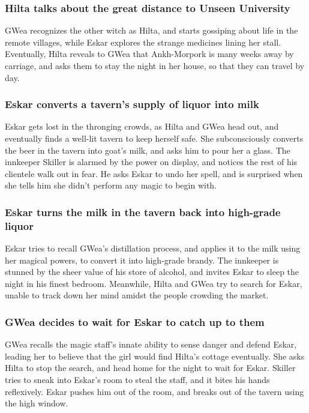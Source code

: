 \subsubsection{\Gls{Hilta} talks about the great distance to Unseen University}
\Gls{GWea} recognizes the other witch as \Gls{Hilta}, and starts gossiping about life in the remote
villages, while \Gls{Eskar} explores the strange medicines lining her stall. Eventually, \Gls{Hilta}
reveals to \Gls{GWea} that Ankh-Morpork is many weeks away by carriage, and asks them to stay the
night in her house, so that they can travel by day.

\subsubsection{\Gls{Eskar} converts a tavern's supply of liquor into milk}
\Gls{Eskar} gets lost in the thronging crowds, as \Gls{Hilta} and \Gls{GWea} head out, and
eventually finds a well-lit tavern to keep herself safe. She subconsciously converts the beer in
the tavern into goat's milk, and asks him to pour her a glass. The innkeeper \Gls{Skiller} is
alarmed by the power on display, and notices the rest of his clientele walk out in fear. He asks
\Gls{Eskar} to undo her spell, and is surprised when she tells him she didn't perform any magic to
begin with.

\subsubsection{\Gls{Eskar} turns the milk in the tavern back into high-grade liquor}
\Gls{Eskar} tries to recall \Gls{GWea}'s distillation process, and applies it to the milk using
her magical powers, to convert it into high-grade brandy. The innkeeper is stunned by the sheer
value of his store of alcohol, and invites \Gls{Eskar} to sleep the night in his finest bedroom.
Meanwhile, \Gls{Hilta} and \Gls{GWea} try to search for \Gls{Eskar}, unable to track down her mind
amidst the people crowding the market.

\subsubsection{\Gls{GWea} decides to wait for \Gls{Eskar} to catch up to them}
\Gls{GWea} recalls the magic staff's innate ability to sense danger and defend \Gls{Eskar}, leading
her to believe that the girl would find \Gls{Hilta}'s cottage eventually. She asks \Gls{Hilta} to
stop the search, and head home for the night to wait for \Gls{Eskar}. \Gls{Skiller} tries to sneak
into \Gls{Eskar}'s room to steal the staff, and it bites his hands reflexively. \Gls{Eskar}
pushes him out of the room, and breaks out of the tavern using the high window.

